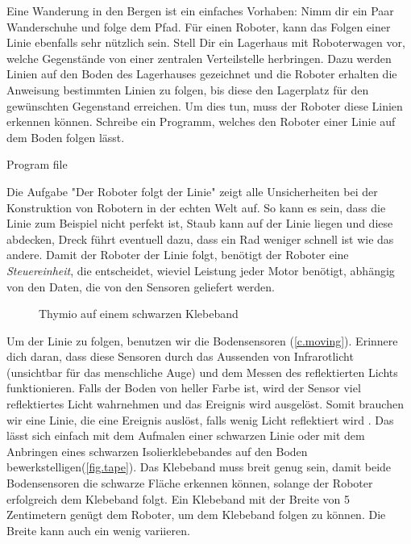 \label{ch.line}

Eine Wanderung in den Bergen ist ein einfaches Vorhaben: Nimm dir ein Paar Wanderschuhe und folge dem Pfad. Für einen Roboter, kann das Folgen einer Linie ebenfalls sehr nützlich sein.
Stell Dir ein Lagerhaus mit Roboterwagen vor,
welche Gegenstände von einer zentralen Verteilstelle herbringen.
Dazu werden Linien auf den Boden des Lagerhauses gezeichnet
und die Roboter erhalten die Anweisung bestimmten Linien zu folgen,
bis diese den Lagerplatz für den gewünschten Gegenstand erreichen.
Um dies tun, muss der Roboter diese Linien erkennen können.
Schreibe ein Programm, welches den Roboter einer Linie auf dem Boden folgen lässt.

{\raggedleft \hfill Program file }

Die Aufgabe "Der Roboter folgt der Linie"  zeigt
alle Unsicherheiten bei der Konstruktion von Robotern in der echten Welt auf.
So kann es sein, dass die Linie zum Beispiel nicht perfekt ist,
Staub kann auf der Linie liegen und diese abdecken,
Dreck führt eventuell dazu, dass ein Rad weniger schnell ist wie das andere.
Damit der Roboter der Linie folgt, benötigt der Roboter eine
\emph{Steuereinheit}, die entscheidet, wieviel Leistung jeder Motor benötigt,
abhängig von den Daten, die von den Sensoren geliefert werden.


\begin{figure}
	\hfill
	\caption{Thymio auf einem schwarzen Klebeband}
\end{figure}
Um der Linie zu folgen, benutzen wir die Bodensensoren (\cref{c.moving}). Erinnere dich daran, dass diese Sensoren durch das Aussenden von Infrarotlicht (unsichtbar für das menschliche Auge) und dem Messen des reflektierten Lichts funktionieren. Falls der Boden von heller Farbe ist,
wird der Sensor viel reflektiertes Licht wahrnehmen und das Ereignis   wird ausgelöst.
Somit brauchen wir eine Linie, die eine Ereignis auslöst, 
falls wenig Licht reflektiert wird .
Das lässt sich einfach mit dem Aufmalen einer schwarzen Linie oder mit dem Anbringen eines schwarzen
Isolierklebebandes auf den Boden bewerkstelligen(\cref{fig.tape}).
Das Klebeband muss breit genug sein,
damit beide Bodensensoren die schwarze Fläche erkennen können,
solange der Roboter erfolgreich dem Klebeband folgt.
Ein Klebeband mit der Breite von 5 Zentimetern genügt dem Roboter,
um dem Klebeband folgen zu können. Die Breite kann auch ein wenig variieren.

